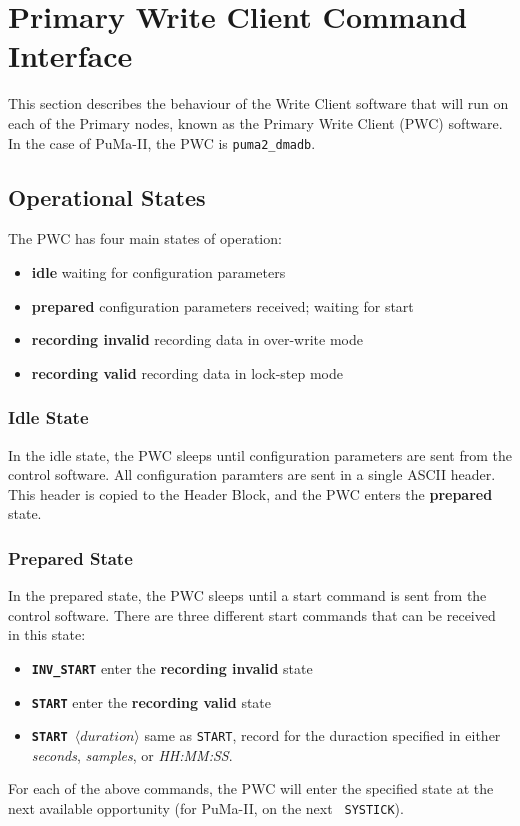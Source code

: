 \newpage
\section{Primary Write Client Command Interface}
\label{sec:pwc}

This section describes the behaviour of the Write Client software that
will run on each of the Primary nodes, known as the Primary Write
Client (PWC) software.  In the case of PuMa-II, the PWC is 
{\tt puma2\_dmadb}.

\subsection{Operational States}

The PWC has four main states of operation:
\begin{itemize}
\item {\bf idle} waiting for configuration parameters
\item {\bf prepared} configuration parameters received; waiting for start
\item {\bf recording invalid} recording data in over-write mode
\item {\bf recording valid} recording data in lock-step mode
\end{itemize}

\subsubsection{Idle State}

In the idle state, the PWC sleeps until configuration parameters are
sent from the control software.  All configuration paramters are sent
in a single ASCII header.  This header is copied to the Header Block,
and the PWC enters the {\bf prepared} state.

\subsubsection{Prepared State}

In the prepared state, the PWC sleeps until a start command is sent
from the control software.  There are three different start commands
that can be received in this state:

\begin{itemize}
\item {\tt\bf INV\_START} enter the {\bf recording invalid} state
\item {\tt\bf START} enter the {\bf recording valid} state
\item {\tt\bf START $\langle duration\rangle$} same as {\tt START}, record
	for the duraction specified in either {\it seconds}, {\it samples},
	or {\it HH:MM:SS}.
\end{itemize}
For each of the above commands, the PWC will enter the specified state
at the next available opportunity (for PuMa-II, on the next {\tt
SYSTICK}).

